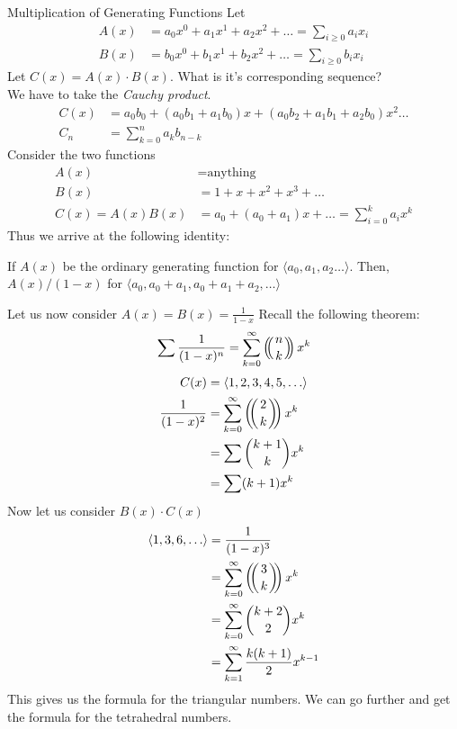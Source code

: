 \documentclass[11pt,twosided]{article}
\def\multiset#1#2{\left(\!\!\left({#1\atopwithdelims..#2}\right)\!\!\right)}
\begin{document}
\begin{section}{Multiplication of Generating Functions}
Let
\begin{align*}
    A(x) &= a_0 x^0 + a_1 x^1 + a_2 x^2 + \ldots = \sum_{i\geq 0} a_i x_i \\
    B(x) &= b_0 x^0 + b_1 x^1 + b_2 x^2 + \ldots = \sum_{i\geq 0} b_i x_i
\end{align*}
Let $C(x) = A(x)\cdot B(x)$. What is it's corresponding sequence?\\
We have to take the \emph{Cauchy product}.
\begin{align*}
    C(x) &= a_0b_0 + (a_0 b_1 + a_1 b_0)x + (a_0 b_2 + a_1 b_1 + a_2 b_0)x^2 \ldots \\
    C_n &= \sum_{k=0}^n a_k b_{n-k}
\end{align*}
Consider the two functions
\begin{align*}
    A(x) &= \text{anything} \\
    B(x) &= 1 + x + x^2 + x^3 + \ldots \\
    C(x) = A(x) B(x) &= a_0 + (a_0 + a_1) x + \ldots = \sum_{i=0}^k a_i x^k
\end{align*}
Thus we arrive at the following identity:
\begin{theorem}
If $A(x)$ be the ordinary generating function for $\langle a_0, a_1, a_2 \ldots \rangle$. Then, $A(x)/(1-x)$ for $\langle a_0, a_0+a_1, a_0+a_1+a_2, \ldots \rangle$
\end{theorem}
Let us now consider $A(x) = B(x) = \frac{1}{1-x}$ Recall the following theorem:
$$\sum \frac{1}{(1-x)^n} = \sum_{k=0}^\infty \multiset{n}{k}x^k$$
\begin{align*}
    C(x) &= \langle 1, 2, 3, 4, 5, \ldots \rangle \\
    \frac{1}{(1-x)^2} &= \sum_{k=0}^\infty \multiset{2}{k} x^k \\
    &= \sum {{k+1}\choose k} x^k \\
    &= \sum (k+1) x^k
\end{align*}
Now let us consider $B(x)\cdot C(x)$
\begin{align*}
    \langle 1, 3, 6, \ldots \rangle &= \frac{1}{(1-x)^3} \\
    &= \sum_{k=0}^\infty \multiset{3}{k}x^k \\
    &= \sum_{k=0}^\infty {k + 2 \choose 2} x^k \\
    &= \sum_{k=1}^\infty \frac{k(k+1)}{2} x^{k-1}
\end{align*}
This gives us the formula for the triangular numbers. We can go further and get the formula for the tetrahedral numbers.

\end{section}
\end{document}
